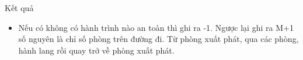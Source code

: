 Kết quả
\begin{itemize}
	\item Nếu có không có hành trình nào an toàn thì ghi ra -1. Ngược lại ghi ra M+1 số nguyên là chỉ số phòng trên đường đi. Từ phòng xuất phát, qua các phòng, hành lang rồi quay trở về phòng xuất phát.
\end{itemize}